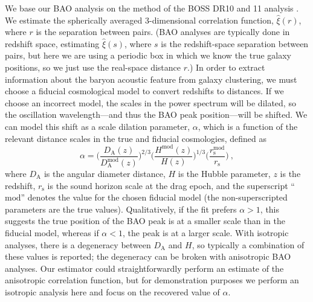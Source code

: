 We base our BAO analysis on the method of the BOSS DR10 and 11 analysis \citep{Anderson2014}.
We estimate the spherically averaged 3-dimensional correlation function, $\hat{\xi}(r)$, where $r$ is the separation between pairs.
(BAO analyses are typically done in redshift space, estimating $\hat{\xi}(s)$, where $s$ is the redshift-space separation between pairs, but here we are using a periodic box in which we know the true galaxy positions, so we just use the real-space distance $r$.)
In order to extract information about the baryon acoustic feature from galaxy clustering, we must choose a fiducial cosmological model to convert redshifts to distances.
If we choose an incorrect model, the scales in the power spectrum will be dilated, so the oscillation wavelength---and thus the BAO peak position---will be shifted.
We can model this shift as a scale dilation parameter, $\alpha$, which is a function of the relevant distance scales in the true and fiducial cosmologies, defined as
\begin{equation} \label{eq:alpha}
\alpha = \Bigg( \frac{D_\mathrm{A}(z)}{D_\mathrm{A}^{\text{mod}}(z)} \Bigg)^{2/3} \Bigg( \frac{H^{\text{mod}}(z)}{H(z)} \Bigg)^{1/3} \Bigg( \frac{r_\mathrm{s}^{\text{mod}}}{r_\mathrm{s}} \Bigg) ~,
\end{equation}
where $D_\mathrm{A}$ is the angular diameter distance, $H$ is the Hubble parameter, $z$ is the redshift, $r_\mathrm{s}$ is the sound horizon scale at the drag epoch, and the superscript ``$\text{mod}$'' denotes the value for the chosen fiducial model (the non-superscripted parameters are the true values).
Qualitatively, if the fit prefers $\alpha>1$, this suggests the true position of the BAO peak is at a smaller scale than in the fiducial model, whereas if $\alpha<1$, the peak is at a larger scale.
With isotropic analyses, there is a degeneracy between $D_\mathrm{A}$ and $H$, so typically a combination of these values is reported; the degeneracy can be broken with anisotropic BAO analyses.
Our estimator could straightforwardly perform an estimate of the anisotropic correlation function, but for demonstration purposes we perform an isotropic analysis here and focus on the recovered value of $\alpha$.

